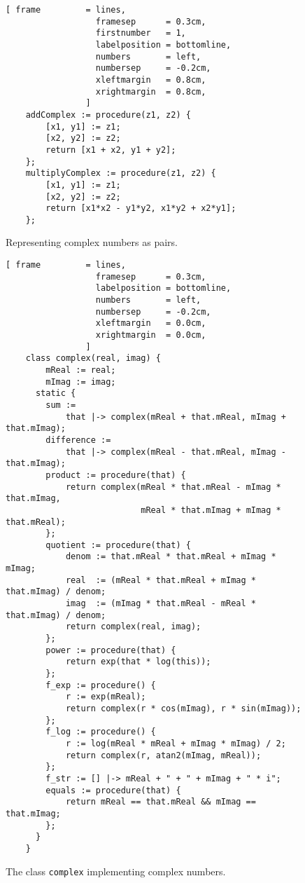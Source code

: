 \begin{figure}[!ht]
\centering
\begin{Verbatim}[ frame         = lines, 
                  framesep      = 0.3cm, 
                  firstnumber   = 1,
                  labelposition = bottomline,
                  numbers       = left,
                  numbersep     = -0.2cm,
                  xleftmargin   = 0.8cm,
                  xrightmargin  = 0.8cm,
                ]
    addComplex := procedure(z1, z2) {
        [x1, y1] := z1;
        [x2, y2] := z2;
        return [x1 + x2, y1 + y2];	
    }; 
    multiplyComplex := procedure(z1, z2) {
        [x1, y1] := z1;
        [x2, y2] := z2;
        return [x1*x2 - y1*y2, x1*y2 + x2*y1];	
    }; 
\end{Verbatim}
\vspace*{-0.3cm}
\caption{Representing complex numbers as pairs.}
\label{fig:add-complex.stlx}
\end{figure}


\begin{figure}[!ht]
\centering
\begin{Verbatim}[ frame         = lines, 
                  framesep      = 0.3cm, 
                  labelposition = bottomline,
                  numbers       = left,
                  numbersep     = -0.2cm,
                  xleftmargin   = 0.0cm,
                  xrightmargin  = 0.0cm,
                ]
    class complex(real, imag) {
        mReal := real;
        mImag := imag;
      static {    
        sum := 
            that |-> complex(mReal + that.mReal, mImag + that.mImag);
        difference := 
            that |-> complex(mReal - that.mReal, mImag - that.mImag);
        product := procedure(that) {
            return complex(mReal * that.mReal - mImag * that.mImag,
                           mReal * that.mImag + mImag * that.mReal);
        };
        quotient := procedure(that) {
            denom := that.mReal * that.mReal + mImag * mImag;
            real  := (mReal * that.mReal + mImag * that.mImag) / denom;
            imag  := (mImag * that.mReal - mReal * that.mImag) / denom;
            return complex(real, imag);
        };
        power := procedure(that) {
            return exp(that * log(this));
        };
        f_exp := procedure() {
            r := exp(mReal);
            return complex(r * cos(mImag), r * sin(mImag));
        };
        f_log := procedure() {
            r := log(mReal * mReal + mImag * mImag) / 2; 
            return complex(r, atan2(mImag, mReal));
        };
        f_str := [] |-> mReal + " + " + mImag + " * i";
        equals := procedure(that) {
            return mReal == that.mReal && mImag == that.mImag;
        };
      }
    }
\end{Verbatim}
\vspace*{-0.3cm}
\caption{The class \texttt{complex} implementing complex numbers.}
\label{fig:complex.stlx}
\end{figure}

